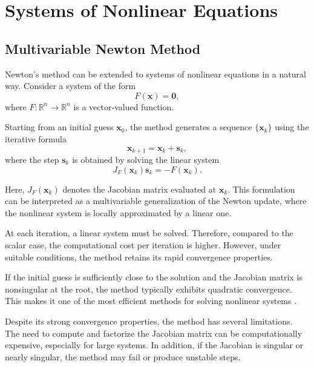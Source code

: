\chapter{Systems of Nonlinear Equations}

\section{Multivariable Newton Method}

Newton's method can be extended to systems of nonlinear equations in a natural way. Consider a system of the form
\begin{equation}
F(\mathbf{x}) = \mathbf{0},
\end{equation}
where \( F : \mathbb{R}^n \to \mathbb{R}^n \) is a vector-valued function.

Starting from an initial guess \( \mathbf{x}_0 \), the method generates a sequence \( \{\mathbf{x}_k\} \) using the iterative formula
\begin{equation}
\mathbf{x}_{k+1} = \mathbf{x}_k + \mathbf{s}_k,
\end{equation}
where the step \( \mathbf{s}_k \) is obtained by solving the linear system
\begin{equation}
J_F(\mathbf{x}_k)\mathbf{s}_k = -F(\mathbf{x}_k).
\end{equation}

Here, \( J_F(\mathbf{x}_k) \) denotes the Jacobian matrix evaluated at \( \mathbf{x}_k \). This formulation can be interpreted as a multivariable generalization of the Newton update, where the nonlinear system is locally approximated by a linear one.

At each iteration, a linear system must be solved. Therefore, compared to the scalar case, the computational cost per iteration is higher. However, under suitable conditions, the method retains its rapid convergence properties.

If the initial guess is sufficiently close to the solution and the Jacobian matrix is nonsingular at the root, the method typically exhibits quadratic convergence. This makes it one of the most efficient methods for solving nonlinear systems \cite{kelley, burden}.

Despite its strong convergence properties, the method has several limitations. The need to compute and factorize the Jacobian matrix can be computationally expensive, especially for large systems. In addition, if the Jacobian is singular or nearly singular, the method may fail or produce unstable steps.

